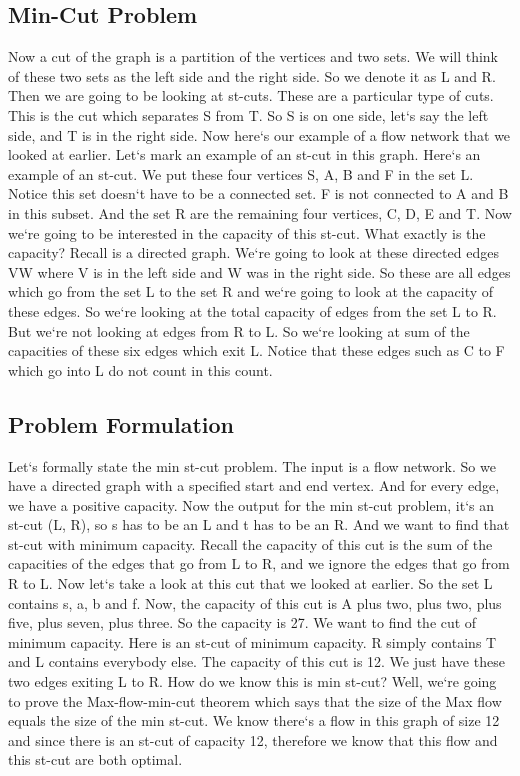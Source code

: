 \subsection{Min-Cut Problem}
Now a cut of the graph is a partition of the vertices and two sets.
We will think of these two sets as the left side and the right side.
So we denote it as L and R\@.
Then we are going to be looking at st-cuts.
These are a particular type of cuts.
This is the cut which separates S from T\@.
So S is on one side, let`s say the left side, and T is in the right side.
Now here`s our example of a flow network that we looked at earlier.
Let`s mark an example of an st-cut in this graph.
Here`s an example of an st-cut.
We put these four vertices S, A, B and F in the set L\@.
Notice this set doesn`t have to be a connected set.
F is not connected to A and B in this subset.
And the set R are the remaining four vertices, C, D, E and T\@.
Now we`re going to be interested in the capacity of this st-cut.
What exactly is the capacity? Recall is a directed graph.
We`re going to look at these directed edges VW where V is in the left side and W was in the right side.
So these are all edges which go from the set L to the set R and we`re going to look at the capacity of these edges.
So we`re looking at the total capacity of edges from the set L to R\@.
But we`re not looking at edges from R to L\@.
So we`re looking at sum of the capacities of these six edges which exit L\@.
Notice that these edges such as C to F which go into L do not count in this count.

\subsection{Problem Formulation}
Let`s formally state the min st-cut problem.
The input is a flow network.
So we have a directed graph with a specified start and end vertex.
And for every edge, we have a positive capacity.
Now the output for the min st-cut problem, it`s an st-cut (L, R), so s has to be an L and t has to be an R\@.
And we want to find that st-cut with minimum capacity.
Recall the capacity of this cut is the sum of the capacities of the edges that go from L to R, and we ignore the edges that go from R to L\@.
Now let`s take a look at this cut that we looked at earlier.
So the set L contains s, a, b and f.
Now, the capacity of this cut is A plus two, plus two, plus five, plus seven, plus three.
So the capacity is 27.
We want to find the cut of minimum capacity.
Here is an st-cut of minimum capacity.
R simply contains T and L contains everybody else.
The capacity of this cut is 12.
We just have these two edges exiting L to R\@.
How do we know this is min st-cut? Well, we`re going to prove the Max-flow-min-cut theorem which says that the size of the Max flow equals the size of the min st-cut.
We know there`s a flow in this graph of size 12 and since there is an st-cut of capacity 12, therefore we know that this flow and this st-cut are both optimal.

